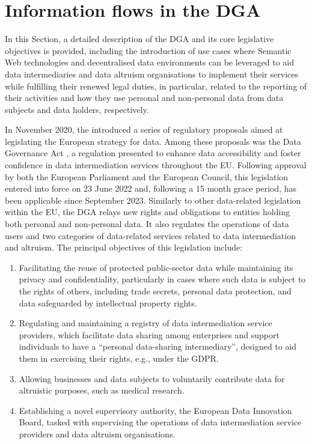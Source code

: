 \section{Information flows in the DGA}
\label{sec:dga_flows}

In this Section, a detailed description of the DGA and its core legislative objectives is provided, including the introduction of use cases where Semantic Web technologies and decentralised data environments can be leveraged to aid data intermediaries and data altruism organisations to implement their services while fulfilling their renewed legal duties, in particular, related to the reporting of their activities and how they use personal and non-personal data from data subjects and data holders, respectively.

In November 2020, the \cite{european_commission_communication_2020} introduced a series of regulatory proposals aimed at legislating the European strategy for data.
Among these proposals was the Data Governance Act \citeyearpar{noauthor_regulation_2022}, a regulation presented to enhance data accessibility and foster confidence in data intermediation services throughout the EU.
Following approval by both the European Parliament and the European Council, this legislation entered into force on 23 June 2022 and, following a 15 month grace period, has been applicable since September 2023.
Similarly to other data-related legislation within the EU, the DGA relays new rights and obligations to entities holding both personal and non-personal data.
It also regulates the operations of data users and two categories of data-related services related to data intermediation and altruism.
The principal objectives of this legislation include:
\begin{enumerate}
    \item Facilitating the reuse of protected public-sector data while maintaining its privacy and confidentiality, particularly in cases where such data is subject to the rights of others, including trade secrets, personal data protection, and data safeguarded by intellectual property rights.
    \item Regulating and maintaining a registry of data intermediation service providers, which facilitate data sharing among enterprises and support individuals to have a ``personal data-sharing intermediary'', designed to aid them in exercising their rights, e.g., under the GDPR.
    \item Allowing businesses and data subjects to voluntarily contribute data for altruistic purposes, such as medical research.
    \item Establishing a novel supervisory authority, the European Data Innovation Board, tasked with supervising the operations of data intermediation service providers and data altruism organisations.
\end{enumerate}

